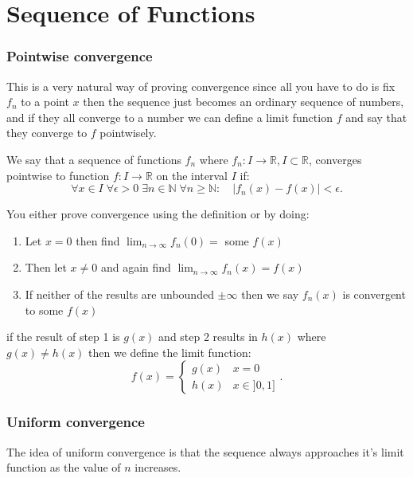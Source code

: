 \part{Sequence of Functions}


\section{Pointwise convergence}

This is a very natural way of proving convergence since all you have to do is fix $f_n$ to a point $x$ then the sequence just becomes an ordinary sequence of numbers, and if they all converge to a number we can define a limit function $f$ and say that they converge to $f$ pointwisely.

\begin{definition}
	We say that a sequence of functions $f_n$ where $f_n:I \to \mathbb{R},I\subset \mathbb{R}$, converges pointwise to function $f:I\to \mathbb{R}$ on the interval $I$ if:
	\[
		\forall x\in I \; \forall \epsilon >0 \; \exists n\in \mathbb{N} \; \forall n\ge \mathbb{N}: \quad \left| f_n(x)-f(x) \right|<\epsilon
		.\]
\end{definition}
You either prove convergence using the definition or by doing:
\begin{enumerate}
	\item Let $x=0$ then find $\lim_{n \to \infty} f_n(0)=$ some $f(x)$
	\item Then let $x\neq 0$ and again find $\lim_{n \to \infty} f_n(x)=f(x)$
	\item If neither of the results are unbounded $\pm \infty$ then we say $f_n(x)$ is convergent to some $f(x)$
\end{enumerate}

\begin{remark}
	if the result of step 1 is $g(x)$ and step 2 results in $h(x)$ where $g(x)\neq h(x)$ then we define the limit function:
	\[
		f(x)=\begin{cases}g(x)&x=0\\h(x)&x\in ]0,1]\end{cases}
		.\]
\end{remark}

\section{Uniform convergence}

The idea of uniform convergence is that the sequence always approaches it's limit function as the value of $n$ increases.

